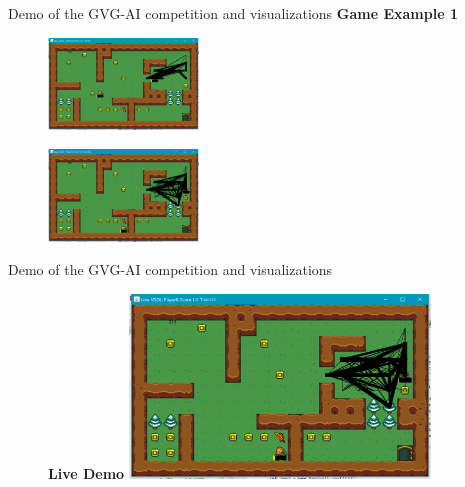 \documentclass{beamer}
\begin{document}
\begin{frame}{Demo of the GVG-AI competition and visualizations}
		\textbf{Game Example 1}
		\begin{figure}[t]
				\includegraphics[width=4cm]{Game-51-1}
				
		\end{figure} 
		
		\begin{figure}[t]
				\includegraphics[width=4cm]{Game-51-2}
				
		\end{figure} \pause
		
\end{frame}

\begin{frame}{Demo of the GVG-AI competition and visualizations}
		\begin{figure}[t]
				\textbf{Live Demo}
				\includegraphics[width=8cm]{Game-51-2}
				\centering
		\end{figure} \pause
		
\end{frame}
\end{document}

